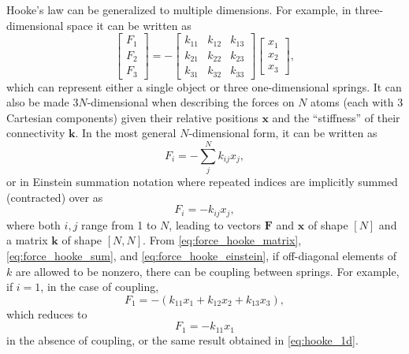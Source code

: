 \documentclass[%
class = book,%
crop = false,%
float = true,%
multi = true,%
preview = false,%
]{standalone}
\begin{document}
Hooke's law can be generalized to multiple dimensions. For example, in three-dimensional space it can be written as
\begin{equation}
  \label{eq:force_hooke_matrix}
  \begin{bmatrix}
    F_{1} \\ F_{2} \\ F_{3}
  \end{bmatrix}
  = -
  \begin{bmatrix}
    k_{11} & k_{12} & k_{13} \\
    k_{21} & k_{22} & k_{23} \\
    k_{31} & k_{32} & k_{33}
  \end{bmatrix}
  \begin{bmatrix}
    x_{1} \\ x_{2} \\ x_{3}
  \end{bmatrix},
\end{equation}
which can represent either a single object or three one-dimensional springs. It can also be made \(3N\)-dimensional when describing the forces on \(N\) atoms (each with 3 Cartesian components) given their relative positions \(\mathbf{x}\) and the ``stiffness'' of their connectivity \(\mathbf{k}\). In the most general \(N\)-dimensional form, it can be written as
\begin{equation}
  \label{eq:force_hooke_sum}
  F_{i} = - \sum_{j}^{N} k_{ij} x_{j},
\end{equation}
or in Einstein summation notation where repeated indices are implicitly summed (contracted) over as
\begin{equation}
  \label{eq:force_hooke_einstein}
  F_{i} = - k_{ij} x_{j},
\end{equation}
where both \(i,j\) range from 1 to \(N\), leading to vectors \(\mathbf{F}\) and \(\mathbf{x}\) of shape \([N]\) and a matrix \(\mathbf{k}\) of shape \([N,N]\). From \eqref{eq:force_hooke_matrix}, \eqref{eq:force_hooke_sum}, and \eqref{eq:force_hooke_einstein}, if off-diagonal elements of \(k\) are allowed to be nonzero, there can be coupling between springs. For example, if \(i = 1\), in the case of coupling,
\begin{equation}
  \label{eq:force_hooke_example}
  F_{1} = -(k_{11}x_{1} + k_{12}x_{2} + k_{13}x_{3}),
\end{equation}
which reduces to
\begin{equation}
  \label{eq:force_hooke_example_nocoupling}
  F_{1} = - k_{11}x_{1}
\end{equation}
in the absence of coupling, or the same result obtained in \eqref{eq:hooke_1d}.
\end{document}
